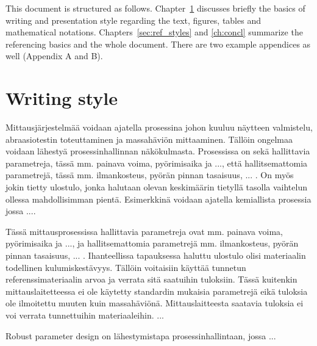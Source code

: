 \documentclass[12pt,a4paper,finnish]{tutthesis}
\begin{document}
This document is structured as follows. Chapter~\ref{ch:style}
discusses briefly the basics of writing and presentation style
regarding the text, figures, tables and mathematical
notations. Chapters~\ref{sec:ref_styles} and \ref{ch:concl} summarize
the referencing basics and the whole document. There are two example
appendices as well (Appendix A and B).



\chapter{Writing style}
\label{ch:style}


Mittausjärjestelmää voidaan ajatella \italics prosessina johon kuuluu
näytteen valmistelu, abraasiotestin toteuttaminen ja massahäviön
mittaaminen. Tällöin ongelmaa voidaan lähestyä prosessinhallinnan
näkökulmasta. Prosessissa on sekä hallittavia parametreja, tässä mm. painava
voima, pyörimisaika ja ..., että hallitsemattomia parametrejä, tässä mm.
ilmankosteus, pyörän pinnan tasaisuus, ... . On myös jokin tietty ulostulo,
jonka halutaan olevan keskimäärin tietyllä tasolla vaihtelun ollessa
mahdollisimman pientä. Esimerkkinä voidaan ajatella kemiallista prosessia
jossa ....

Tässä mittausprosessissa hallittavia parametreja ovat mm. painava
voima, pyörimisaika ja ..., ja hallitsemattomia parametrejä mm.
ilmankosteus, pyörän pinnan tasaisuus, ... . Ihanteellissa tapauksessa
haluttu ulostulo olisi materiaalin todellinen kulumiskestävyys.
Tällöin voitaisiin käyttää tunnetun referenssimateriaalin arvoa ja
verrata sitä saatuihin tuloksiin.
Tässä kuitenkin mittauslaitetteessa ei ole käytetty standardin mukaisia
parametrejä eikä tuloksia ole ilmoitettu muuten kuin massahäviönä.
Mittauslaitteesta saatavia tuloksia ei voi verrata tunnettuihin
materiaaleihin. ...

Robust parameter design on lähestymistapa prosessinhallintaan, jossa ...
\end{document}
